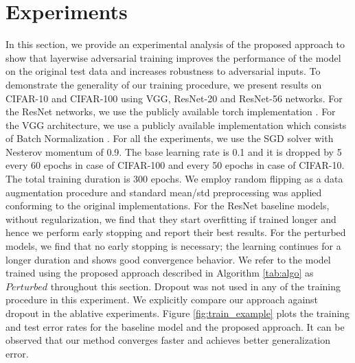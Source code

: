 \documentclass[letterpaper]{article} %
\begin{document}
\section{Experiments}
In this section, we provide an experimental analysis of the proposed approach to show that layerwise adversarial training improves the performance of the model on the original test data and increases robustness to adversarial inputs. To demonstrate the generality of our training procedure, we present results on CIFAR-10 and CIFAR-100 \cite{krizhevsky2009learning} using VGG, ResNet-20 and ResNet-56 networks. For the ResNet networks, we use the publicly available torch implementation \cite{ResNetTorch}. For the VGG architecture, we use a publicly available implementation which consists of Batch Normalization \cite{VGGTorch}. For all the experiments, we use the SGD solver with Nesterov momentum of 0.9. The base learning rate is 0.1 and it is dropped by 5 every 60 epochs in case of CIFAR-100 and every 50 epochs in case of CIFAR-10. The total training duration is 300 epochs. We employ random flipping as a data augmentation procedure and standard mean/std preprocessing was applied conforming to the original implementations. For the ResNet baseline models, without regularization, we find that they start overfitting if trained longer and hence we perform early stopping and report their best results. For the perturbed models, we find that no early stopping is necessary; the learning continues for a longer duration and shows good convergence behavior.  We refer to the model trained using the proposed approach described in Algorithm \ref{tab:algo} as $Perturbed$ throughout this section. Dropout was not used in any of the training procedure in this experiment. We explicitly compare our approach against dropout in the ablative experiments. Figure \ref{fig:train_example} plots the training and test error rates for the baseline model and the proposed approach. It can be observed that our method converges faster and achieves better generalization error.
\end{document}
